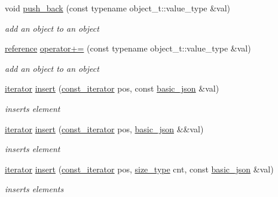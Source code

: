 \begin{DoxyCompactItemize}
void \hyperlink{classnlohmann_1_1basic__json_a5212588544f6d2266384c3be9bfda0c5}{push\-\_\-back} (const typename object\-\_\-t\-::value\-\_\-type \&val)
\begin{DoxyCompactList}\small\item\em add an object to an object \end{DoxyCompactList}\item 
\hyperlink{classnlohmann_1_1basic__json_a3ec8e17be8732fe436e9d6733f52b7a3}{reference} \hyperlink{classnlohmann_1_1basic__json_a9486a272e034c0548305d7a12f3045e6}{operator+=} (const typename object\-\_\-t\-::value\-\_\-type \&val)
\begin{DoxyCompactList}\small\item\em add an object to an object \end{DoxyCompactList}\item 
\hyperlink{classnlohmann_1_1basic__json_1_1iterator}{iterator} \hyperlink{classnlohmann_1_1basic__json_a7f7bbb3a9efef2e2442f538a24c1c47b}{insert} (\hyperlink{classnlohmann_1_1basic__json_1_1const__iterator}{const\-\_\-iterator} pos, const \hyperlink{classnlohmann_1_1basic__json}{basic\-\_\-json} \&val)
\begin{DoxyCompactList}\small\item\em inserts element \end{DoxyCompactList}\item 
\hyperlink{classnlohmann_1_1basic__json_1_1iterator}{iterator} \hyperlink{classnlohmann_1_1basic__json_a8468efcfcd95db15f46887b29924ed5c}{insert} (\hyperlink{classnlohmann_1_1basic__json_1_1const__iterator}{const\-\_\-iterator} pos, \hyperlink{classnlohmann_1_1basic__json}{basic\-\_\-json} \&\&val)
\begin{DoxyCompactList}\small\item\em inserts element \end{DoxyCompactList}\item 
\hyperlink{classnlohmann_1_1basic__json_1_1iterator}{iterator} \hyperlink{classnlohmann_1_1basic__json_a624025acfcf64364d98424402b837bc6}{insert} (\hyperlink{classnlohmann_1_1basic__json_1_1const__iterator}{const\-\_\-iterator} pos, \hyperlink{classnlohmann_1_1basic__json_a1579a8f72a230358d6cd1a6e8a62859b}{size\-\_\-type} cnt, const \hyperlink{classnlohmann_1_1basic__json}{basic\-\_\-json} \&val)
\begin{DoxyCompactList}\small\item\em inserts elements \end{DoxyCompactList}\item 

\end{DoxyCompactItemize}
